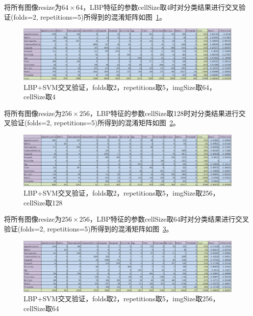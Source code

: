 \documentclass[12pt]{article}
\begin{document}
将所有图像resize为$64 \times 64$，LBP特征的参数cellSize取4时对分类结果进行交叉验证(folds=2, repetitions=5)所得到的混淆矩阵如图~\ref{fig:LBP-SVM-2-folds-5-repetitions-4-64-noNoise}。
\begin{figure}[!ht]
\centering
\includegraphics[width=1.0\linewidth]{LBP-SVM-2-folds-5-repetitions-4-64-noNoise}
\caption{LBP+SVM交叉验证，folds取2，repetitions取5，imgSize取64，cellSize取4}
\label{fig:LBP-SVM-2-folds-5-repetitions-4-64-noNoise}
\end{figure}

将所有图像resize为$256 \times 256$，LBP特征的参数cellSize取128时对分类结果进行交叉验证(folds=2, repetitions=5)所得到的混淆矩阵如图~\ref{fig:LBP-SVM-2-folds-5-repetitions-128-256-noNoise}。
\begin{figure}[!ht]
\centering
\includegraphics[width=1.0\linewidth]{LBP-SVM-2-folds-5-repetitions-128-256-noNoise}
\caption{LBP+SVM交叉验证，folds取2，repetitions取5，imgSize取256，cellSize取128}
\label{fig:LBP-SVM-2-folds-5-repetitions-128-256-noNoise}
\end{figure}

将所有图像resize为$256 \times 256$，LBP特征的参数cellSize取64时对分类结果进行交叉验证(folds=2, repetitions=5)所得到的混淆矩阵如图~\ref{fig:LBP-SVM-2-folds-5-repetitions-64-256-noNoise}。
\begin{figure}[!ht]
\centering
\includegraphics[width=1.0\linewidth]{LBP-SVM-2-folds-5-repetitions-64-256-noNoise}
\caption{LBP+SVM交叉验证，folds取2，repetitions取5，imgSize取256，cellSize取64}
\label{fig:LBP-SVM-2-folds-5-repetitions-64-256-noNoise}
\end{figure}
\end{document}
